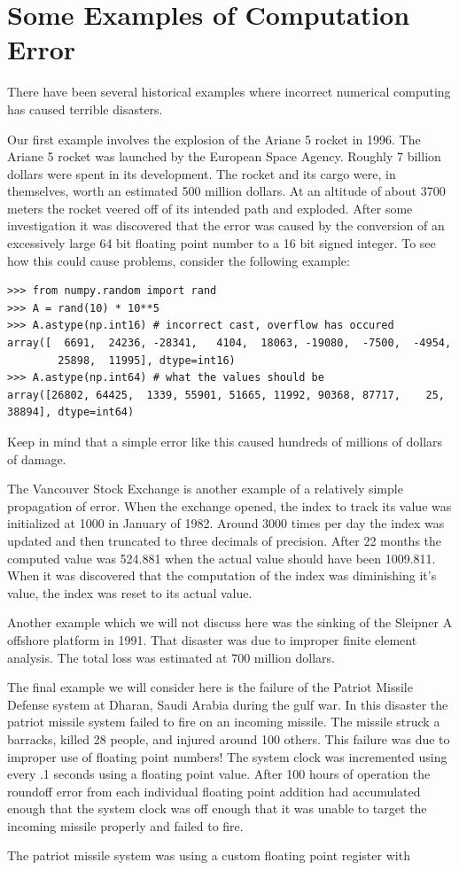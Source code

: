 \section*{Some Examples of Computation Error}

There have been several historical examples where incorrect numerical computing has caused terrible disasters.

Our first example involves the explosion of the Ariane 5 rocket in 1996.
The Ariane 5 rocket was launched by the European Space Agency.
Roughly 7 billion dollars were spent in its development.
The rocket and its cargo were, in themselves, worth an estimated 500 million dollars.
At an altitude of about 3700 meters the rocket veered off of its intended path and exploded.
After some investigation it was discovered that the error was caused by the conversion of an excessively large 64 bit floating point number to a 16 bit signed integer.
To see how this could cause problems, consider the following example:
\begin{lstlisting}
>>> from numpy.random import rand
>>> A = rand(10) * 10**5
>>> A.astype(np.int16) # incorrect cast, overflow has occured
array([  6691,  24236, -28341,   4104,  18063, -19080,  -7500,  -4954,
        25898,  11995], dtype=int16)
>>> A.astype(np.int64) # what the values should be
array([26802, 64425,  1339, 55901, 51665, 11992, 90368, 87717,    25, 38894], dtype=int64)
\end{lstlisting}
Keep in mind that a simple error like this caused hundreds of millions of dollars of damage.

The Vancouver Stock Exchange is another example of a relatively simple propagation of error.
When the exchange opened, the index to track its value was initialized at 1000 in January of 1982.
Around 3000 times per day the index was updated and then truncated to three decimals of precision.
After 22 months the computed value was 524.881 when the actual value should have been 1009.811.
When it was discovered that the computation of the index was diminishing it's value, the index was reset to its actual value.

Another example which we will not discuss here was the sinking of the Sleipner A offshore platform in 1991.
That disaster was due to improper finite element analysis.
The total loss was estimated at 700 million dollars.

The final example we will consider here is the failure of the Patriot Missile Defense system at Dharan, Saudi Arabia during the gulf war.
In this disaster the patriot missile system failed to fire on an incoming missile.
The missile struck a barracks, killed 28 people, and injured around 100 others.
This failure was due to improper use of floating point numbers!
The system clock was incremented using every .1 seconds using a floating point value.
After 100 hours of operation the roundoff error from each individual floating point addition had accumulated enough that the system clock was off enough that it was unable to target the incoming missile properly and failed to fire.

\begin{problem}
The patriot missile system was using a custom floating point register with 
\end{problem}